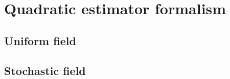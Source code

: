 \section{Quadratic estimator formalism}
\label{sec:estimators}

\subsection{Uniform field}
\label{subsec:uniform}

\subsection{Stochastic field}
\label{subsec:SI}